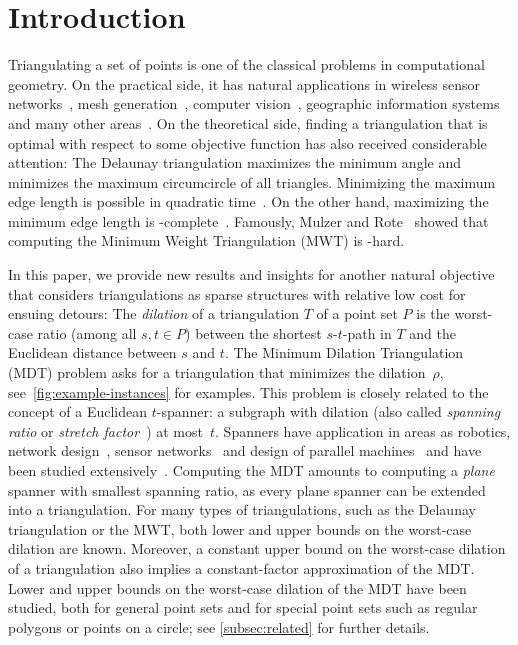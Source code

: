 \section{Introduction}
\label{sec:introduction}
Triangulating a set of points is one of the classical problems in computational
geometry. On the practical side, it has natural applications in wireless sensor
networks~\cite{DBLP:journals/comcom/WuLC07,DBLP:conf/infocom/ZhouWXJD11}, mesh
generation~\cite{bern1995mesh}, computer
vision~\cite{DBLP:conf/evoW/Vite-SilvaCTF07}, geographic information
systems~\cite{DBLP:journals/gis/Tsai93} and many other
areas~\cite{DBLP:books/lib/BergCKO08}. On the theoretical side,
finding a triangulation that is optimal with respect to some 
objective function has also received considerable attention:
The Delaunay triangulation maximizes the minimum angle and minimizes the
maximum circumcircle of all triangles.  Minimizing the
maximum edge length is possible in quadratic
time~\cite{DBLP:journals/siamcomp/EdelsbrunnerT93}.  On the other hand,
maximizing the minimum edge length is
\NP-complete~\cite{DBLP:journals/jocg/FeketeHHST18}. Famously,
Mulzer and Rote~\cite{DBLP:journals/jacm/MulzerR08} showed that 
computing the Minimum Weight Triangulation (MWT) 
is \NP-hard.

In this paper, we provide new results and insights for another natural
objective that considers triangulations as sparse structures with relative low
cost for ensuing detours: The \emph{dilation} of a triangulation $T$ of a point
set $P$ is the worst-case ratio (among all $s, t \in P$) between the shortest
$s$-$t$-path in $T$ and the Euclidean distance between $s$ and $t$.  The
Minimum Dilation Triangulation (MDT) problem asks for a triangulation that
minimizes the dilation~$\rho$, see~\cref{fig:example-instances} for examples.  This problem is closely related to the concept of a
Euclidean $t$-spanner: a subgraph 
with dilation (also called \emph{spanning ratio} or \emph{stretch
factor}~\cite{DBLP:journals/siamcomp/NarasimhanS00}) at most~$t$.  
Spanners have application in areas as robotics, network
design~\cite{DBLP:journals/tpds/AlzoubiLWWF03,DBLP:journals/dam/FarleyPZW04},
sensor networks~\cite{DBLP:journals/siamdm/CaiC95,DBLP:conf/sensys/FanLS06} and
design of parallel machines~\cite{DBLP:journals/comgeo/AronovBCGHSV08} and
have been studied extensively~\cite{DBLP:journals/ijcga/ChandraDNS95}.
Computing the MDT amounts to computing a \emph{plane} spanner with 
smallest spanning ratio, as every plane spanner can be extended into a
triangulation.  
For many types of triangulations, such as the Delaunay triangulation
or the MWT, both lower and upper bounds on the worst-case dilation are
known. Moreover, a constant upper bound on the worst-case dilation of a
triangulation also implies a constant-factor
approximation of the MDT.  Lower and upper bounds on the
worst-case dilation of the MDT have been studied, both for general
point sets and for special point sets such as regular polygons or points on a
circle; see \cref{subsec:related} for further details.

